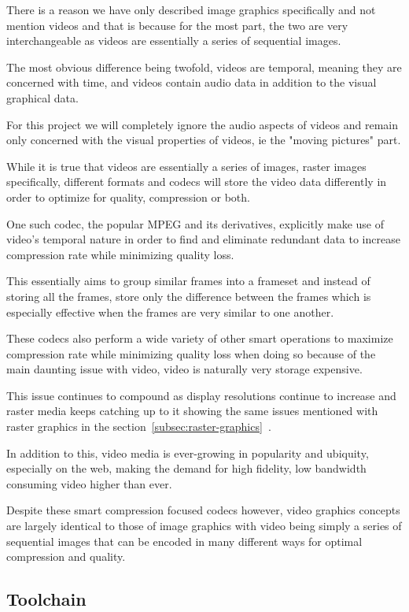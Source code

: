 \documentclass[12pt]{article}
\newcommand{\sentence}{} %
\newcommand{\fullref}[1]{\ref{#1}~\nameref{#1}}
\begin{document}
    \tab
    There is a reason we have only described image graphics specifically and not mention videos and
    that is because for the most part, the two are very interchangeable as videos are essentially a series of
    sequential images.
    \sentence
    The most obvious difference being twofold, videos are temporal, meaning they are concerned with time, and videos
    contain audio data in addition to the visual graphical data.
    \sentence
    For this project we will completely ignore the audio aspects of videos and remain only concerned with the visual
    properties of videos, ie the "moving pictures" part.
    \sentence
    While it is true that videos are essentially a series of images, raster images specifically, different formats
    and codecs will store the video data differently in order to optimize for quality, compression or both.
    \sentence
    One such codec, the popular MPEG and its derivatives, explicitly make use of video's temporal nature in order to
    find and eliminate redundant data to increase compression rate while minimizing quality loss.
    \sentence
    This essentially aims to group similar frames into a frameset and instead of storing all the frames, store only
    the difference between the frames which is especially effective when the frames are very similar to one another.
    \sentence
    These codecs also perform a wide variety of other smart operations to maximize compression rate while minimizing
    quality loss when doing so because of the main daunting issue with video, video is naturally very storage expensive.
    \sentence
    This issue continues to compound as display resolutions continue to increase and raster media keeps catching up
    to it showing the same issues mentioned with raster graphics in the section~\fullref{subsec:raster-graphics}.
    \sentence
    In addition to this, video media is ever-growing in popularity and ubiquity, especially on the web, making the
    demand for high fidelity, low bandwidth consuming video higher than ever.
    \sentence
    Despite these smart compression focused codecs however, video graphics concepts are largely identical to those of
    image graphics with video being simply a series of sequential images that can be encoded in many different ways
    for optimal compression and quality.

    \subsection{Toolchain}\label{subsec:toolchain}
\end{document}
